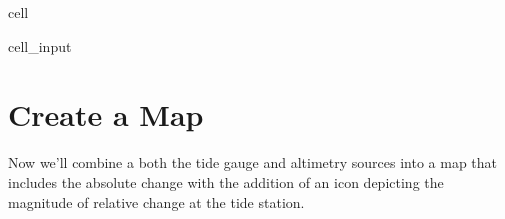 \documentclass[letterpaper,10pt,english]{jupyterBook}
\begin{document}
\begin{sphinxuseclass}{cell}\begin{sphinxVerbatimInput}

\begin{sphinxuseclass}{cell_input}
\begin{sphinxVerbatim}[commandchars=\\\{\}]
    

  
  
\end{sphinxVerbatim}

\end{sphinxuseclass}\end{sphinxVerbatimInput}

\end{sphinxuseclass}

\section{Create a Map}
\label{\detokenize{notebooks/regional_and_local/SL_Trend:create-a-map}}\label{\detokenize{notebooks/regional_and_local/SL_Trend:id4}}
\sphinxAtStartPar
Now we’ll combine a both the tide gauge and altimetry sources into a map that includes the absolute change with the addition of an icon depicting the magnitude of relative change at the tide station.
\end{document}
